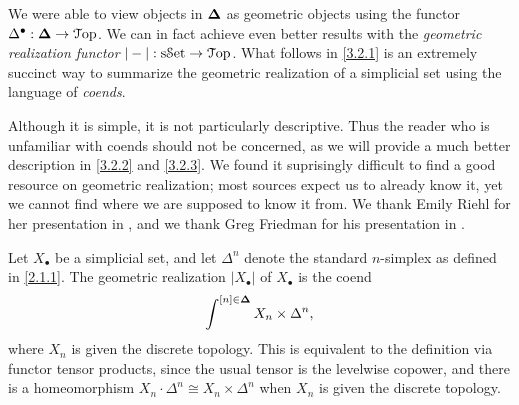 We were able to view objects in $\boldsymbol{\Delta}$ as geometric objects using the functor $\Delta^{\bullet}  : \boldsymbol{\Delta}\to\mathcal{T}\mathrm{op}$. We can in fact achieve even better results with the \emph{geometric realization functor} $|-| : \mathrm{s}\mathcal{S}\mathrm{et}\to\mathcal{T}\mathrm{op}$. What follows in \cref{3.2.1} is an extremely succinct way to summarize the geometric realization of a simplicial set using the language of \emph{coends}.

Although it is simple, it is not particularly descriptive. Thus the reader who is unfamiliar with coends should not be concerned, as we will provide a much better description in \cref{3.2.2} and \cref{3.2.3}. We found it suprisingly difficult to find a good resource on geometric realization; most sources expect us to already know it, yet we cannot find where we are supposed to know it from. We thank Emily Riehl for her presentation in \cite{sset}, and we thank Greg Friedman for his presentation in \cite{fried}.

\begin{definition}\label{3.2.1}
    Let $X_\bullet$ be a simplicial set, and let $\Delta^n$ denote the standard $n$-simplex as defined in \cref{2.1.1}. The geometric realization $|X_\bullet|$ of $X_\bullet$ is the coend
    \[
    \int^{[n]\in\boldsymbol{\Delta}} X_n \times \Delta^n,
    \]
    where $X_n$ is given the discrete topology. This is equivalent to the definition via functor tensor products, since the usual tensor is the levelwise copower, and there is a homeomorphism $X_n\cdot\Delta^n\cong X_n\times\Delta^n$ when $X_n$ is given the discrete topology.
\end{definition}

